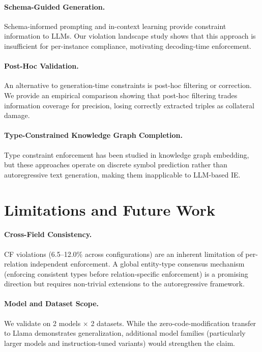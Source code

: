 \documentclass[11pt,a4paper]{article}
\begin{document}
\paragraph{Schema-Guided Generation.} Schema-informed prompting and in-context learning provide constraint information to LLMs. Our violation landscape study shows that this approach is insufficient for per-instance compliance, motivating decoding-time enforcement.

\paragraph{Post-Hoc Validation.} An alternative to generation-time constraints is post-hoc filtering or correction. We provide an empirical comparison showing that post-hoc filtering trades information coverage for precision, losing correctly extracted triples as collateral damage.

\paragraph{Type-Constrained Knowledge Graph Completion.} Type constraint enforcement has been studied in knowledge graph embedding, but these approaches operate on discrete symbol prediction rather than autoregressive text generation, making them inapplicable to LLM-based IE.

\section{Limitations and Future Work}
\label{sec:limitations}

\paragraph{Cross-Field Consistency.} CF violations (6.5--12.0\% across configurations) are an inherent limitation of per-relation independent enforcement. A global entity-type consensus mechanism (enforcing consistent types before relation-specific enforcement) is a promising direction but requires non-trivial extensions to the autoregressive framework.

\paragraph{Model and Dataset Scope.} We validate on 2 models $\times$ 2 datasets. While the zero-code-modification transfer to Llama demonstrates generalization, additional model families (particularly larger models and instruction-tuned variants) would strengthen the claim.
\end{document}
